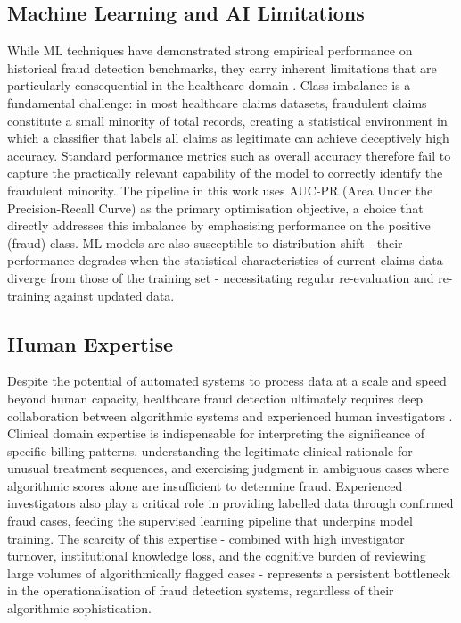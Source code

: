 \subsection{Machine Learning and AI Limitations}

While ML techniques have demonstrated strong empirical performance on historical fraud detection benchmarks, they carry inherent limitations that are particularly consequential in the healthcare domain \cite{gerke2019}. Class imbalance is a fundamental challenge: in most healthcare claims datasets, fraudulent claims constitute a small minority of total records, creating a statistical environment in which a classifier that labels all claims as legitimate can achieve deceptively high accuracy. Standard performance metrics such as overall accuracy therefore fail to capture the practically relevant capability of the model to correctly identify the fraudulent minority. The pipeline in this work uses AUC-PR (Area Under the Precision-Recall Curve) as the primary optimisation objective, a choice that directly addresses this imbalance by emphasising performance on the positive (fraud) class. ML models are also susceptible to distribution shift - their performance degrades when the statistical characteristics of current claims data diverge from those of the training set - necessitating regular re-evaluation and re-training against updated data.

\subsection{Human Expertise}

Despite the potential of automated systems to process data at a scale and speed beyond human capacity, healthcare fraud detection ultimately requires deep collaboration between algorithmic systems and experienced human investigators \cite{abdallah2016}. Clinical domain expertise is indispensable for interpreting the significance of specific billing patterns, understanding the legitimate clinical rationale for unusual treatment sequences, and exercising judgment in ambiguous cases where algorithmic scores alone are insufficient to determine fraud. Experienced investigators also play a critical role in providing labelled data through confirmed fraud cases, feeding the supervised learning pipeline that underpins model training. The scarcity of this expertise - combined with high investigator turnover, institutional knowledge loss, and the cognitive burden of reviewing large volumes of algorithmically flagged cases - represents a persistent bottleneck in the operationalisation of fraud detection systems, regardless of their algorithmic sophistication.

